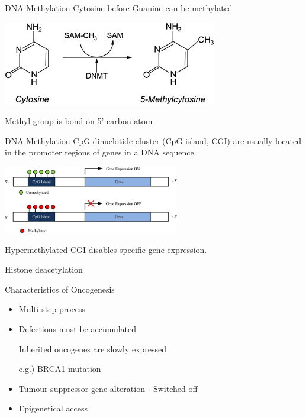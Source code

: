 \documentclass{beamer}
\begin{document}
    \begin{frame}{DNA Methylation}
        Cytosine before Guanine can be methylated

        \begin{center}
            \includegraphics{5mc.png}
        \end{center}

        Methyl group is bond on 5' carbon atom
    \end{frame}

    \begin{frame}{DNA Methylation}
        CpG dinuclotide cluster (CpG island, CGI) are usually located in the promoter regions of genes in a DNA sequence.
        \begin{center}
            \includegraphics[height=8em]{1}
        \end{center}
        Hypermethylated CGI disables specific gene expression.
    \end{frame}

    \begin{frame}{Histone deacetylation}

    \end{frame}

    \begin{frame}{Characteristics of Oncogenesis}
        \begin{itemize}
            \item Multi-step process
            \item Defections must be accumulated
                  
                  \vspace{1em}
                  {\small Inherited oncogenes are slowly expressed 
                  
                  e.g.) BRCA1 mutation}
                  \vspace{1em}

            \item Tumour suppressor gene alteration - Switched off
            \item Epigenetical access
        \end{itemize}
    \end{frame}
\end{document}
